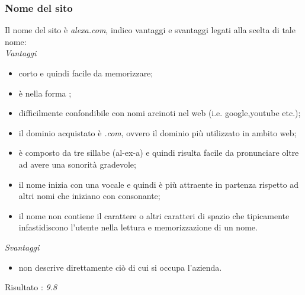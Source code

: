 \subsubsection{Nome del sito}
Il nome del sito è \textit{alexa.com}, indico vantaggi e svantaggi legati alla scelta di tale nome: \\
\textit{Vantaggi}
\begin{itemize}
	\item corto e quindi facile da memorizzare;
	\item è nella forma ;
	\item difficilmente confondibile con nomi arcinoti nel web (i.e. google,youtube etc.);
	\item il dominio acquistato è \textit{.com}, ovvero il dominio più utilizzato in ambito web;
	\item è composto da tre sillabe (al-ex-a) e quindi risulta facile da pronunciare
	oltre ad avere una sonorità gradevole;
	\item il nome inizia con una vocale e quindi è più attraente in partenza rispetto
	ad altri nomi che iniziano con consonante;
	\item il nome non contiene il carattere \quotes{-} o altri caratteri di spazio 
	che tipicamente infastidiscono l'utente nella lettura e memorizzazione di un nome.
\end{itemize}
\textit{Svantaggi}
\begin{itemize}
	\item non descrive direttamente ciò di cui si occupa l'azienda.
\end{itemize}
Risultato : \textit{9.8}
